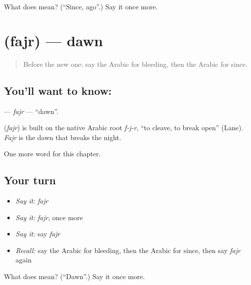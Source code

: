 \begin{tcolorbox}[breakable,colback=teal!4,colframe=teal!35!black,title={Before you move on}]
What does  mean? (\textquotedblleft{}Since, ago\textquotedblright{}.) Say it once more.
\end{tcolorbox}
\section[\texorpdfstring{\ar{فجر} (fajr)}{فجر (fajr)}]{ (fajr) — dawn}

\label{lesson:AR-C233-fajr}



\begin{quote}
Before the new one: say the Arabic for bleeding, then the Arabic for since.
\end{quote}

\subsection*{You'll want to know: }
\textbf{} — \emph{fajr} — \textquotedblleft{}dawn\textquotedblright{}.

\begin{cousinweb}
\textbf{} (\emph{fajr}) is built on the native Arabic root \emph{f-j-r}, \textquotedblleft{}to cleave, to break open\textquotedblright{} (Lane). \emph{Fajr} is the dawn that breaks the night.
\end{cousinweb}

\begin{grammarlens}[title={What you've built}]
One more word for this chapter.
\end{grammarlens}

\subsection*{Your turn}
\begin{itemize}
\raggedright
  \item \emph{Say it:} \emph{fajr}
  \item \emph{Say it:} \emph{fajr}, once more
  \item \emph{Say it:} say \emph{fajr}
  \item \emph{Recall:} say the Arabic for bleeding, then the Arabic for since, then say \emph{fajr} again
\end{itemize}

\begin{tcolorbox}[breakable,colback=teal!4,colframe=teal!35!black,title={Before you move on}]
What does  mean? (\textquotedblleft{}Dawn\textquotedblright{}.) Say it once more.
\end{tcolorbox}

